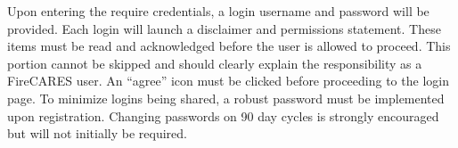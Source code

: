 \documentclass[12pt,oneside]{book}
\begin{document}
Upon entering the require credentials, a login username and password will be provided. Each login will launch a disclaimer and permissions statement. These items must be read and acknowledged before the user is allowed to proceed. This portion cannot be skipped and should clearly explain the responsibility as a FireCARES user. An ``agree'' icon must be clicked before proceeding to the login page. To minimize logins being shared, a robust password must be implemented upon
registration. Changing passwords on 90 day cycles is strongly encouraged but will not initially be required.



\end{document}
